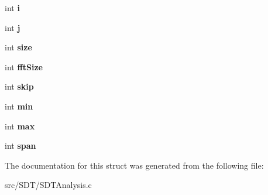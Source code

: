 \begin{DoxyCompactItemize}
\item 
\hypertarget{struct_s_d_t_spectral_feats_acb559820d9ca11295b4500f179ef6392}{}int {\bfseries i}\label{struct_s_d_t_spectral_feats_acb559820d9ca11295b4500f179ef6392}

\item 
\hypertarget{struct_s_d_t_spectral_feats_a37d972ae0b47b9099e30983131d31916}{}int {\bfseries j}\label{struct_s_d_t_spectral_feats_a37d972ae0b47b9099e30983131d31916}

\item 
\hypertarget{struct_s_d_t_spectral_feats_a439227feff9d7f55384e8780cfc2eb82}{}int {\bfseries size}\label{struct_s_d_t_spectral_feats_a439227feff9d7f55384e8780cfc2eb82}

\item 
\hypertarget{struct_s_d_t_spectral_feats_af087e0f81db24c58bfa1e2d4375d0570}{}int {\bfseries fft\+Size}\label{struct_s_d_t_spectral_feats_af087e0f81db24c58bfa1e2d4375d0570}

\item 
\hypertarget{struct_s_d_t_spectral_feats_a13f77b252237844d7b8b6e3c3047fe50}{}int {\bfseries skip}\label{struct_s_d_t_spectral_feats_a13f77b252237844d7b8b6e3c3047fe50}

\item 
\hypertarget{struct_s_d_t_spectral_feats_a3e202b201e6255d975cd6d3aff1f5a4d}{}int {\bfseries min}\label{struct_s_d_t_spectral_feats_a3e202b201e6255d975cd6d3aff1f5a4d}

\item 
\hypertarget{struct_s_d_t_spectral_feats_ae1e1dde676c120fa6d10f3bb2c14059e}{}int {\bfseries max}\label{struct_s_d_t_spectral_feats_ae1e1dde676c120fa6d10f3bb2c14059e}

\item 
\hypertarget{struct_s_d_t_spectral_feats_a63fc22149930803b4e3fb4c453177e5e}{}int {\bfseries span}\label{struct_s_d_t_spectral_feats_a63fc22149930803b4e3fb4c453177e5e}

\end{DoxyCompactItemize}


The documentation for this struct was generated from the following file\+:\begin{DoxyCompactItemize}
\item 
src/\+S\+D\+T/S\+D\+T\+Analysis.\+c\end{DoxyCompactItemize}

